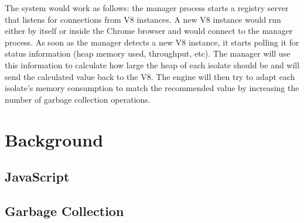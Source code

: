 \documentclass{l4proj}
\begin{document}
The system would work as follows: the manager process starts a registry server that listens for connections from V8 instances. A new V8 instance would run either by itself or inside the Chrome browser and would connect to the manager process. As soon as the manager detects a new V8 instance, it starts polling it for status information (heap memory used, throughput, etc). The manager will use this information to calculate how large the heap of each isolate should be and will send the calculated value back to the V8. The engine will then try to adapt each isolate's memory consumption to match the recommended value by increasing the number of garbage collection operations.
\section{Background}
\subsection{JavaScript}
\subsection{Garbage Collection}


\end{document}
